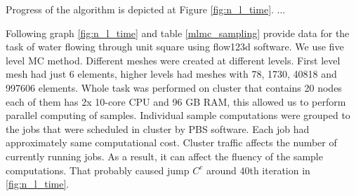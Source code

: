\documentclass{article}
\begin{document}
Progress of the algorithm is depicted at Figure \ref{fig:n_l_time}.  ... 

\break
Following graph \ref{fig:n_l_time} and table \ref{mlmc_sampling} provide data for the task of water flowing through unit square using flow123d \cite{flow123d} software. We use five level MC method. Different meshes were created at different levels. First level mesh had just 6 elements, higher levels had meshes with 78, 1730, 40818 and 997606 elements. Whole task was performed on cluster that contains 20 nodes each of them has 2x 10-core CPU and 96 GB RAM, this allowed us to perform parallel computing of samples. Individual sample computations were grouped to the jobs that were scheduled in cluster by PBS software. Each job had approximately same computational cost. Cluster traffic affects the number of currently running jobs. As a result, it can affect the fluency of the sample computations. That probably caused jump $C^c$ around 40th iteration in \ref{fig:n_l_time}.
\end{document}
